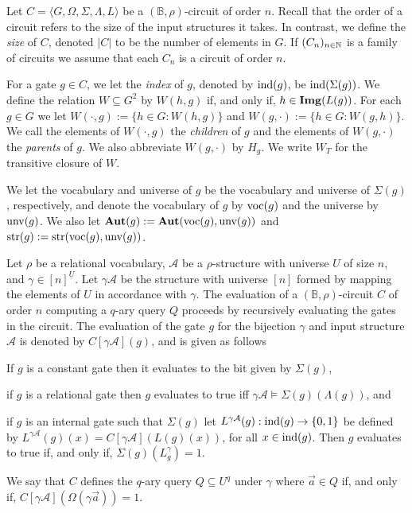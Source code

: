 \documentclass[../main/thesis.tex]{subfiles}
\begin{document}
Let $C = \langle G, \Omega, \Sigma, \Lambda, L \rangle$ be a $(\mathbb{B},
\rho)$-circuit of order $n$. Recall that the order of a circuit refers to the
size of the input structures it takes. In contrast, we define the \emph{size} of
$C$, denoted $\vert C \vert$ to be the number of elements in $G$. If $(C_n)_{n
  \in \mathbb{N}}$ is a family of circuits we assume that each $C_n$ is a circuit of
order $n$.

For a gate $g \in C$, we let the \emph{index} of $g$, denoted by $\text{\upshape ind}(g)$, be
$\text{\upshape ind}(\Sigma(g))$. We define the relation $W \subseteq G^2$ by $W(h,g)$ if, and
only if, $h \in \text{\textbf{Img}}(L(g))$. For each $g \in G$ we let $W(\cdot, g) := \{h \in G
: W(h,g)\}$ and $W(g, \cdot) := \{h \in G : W(g,h)\}$. We call the elements of
$W(\cdot, g)$ the \emph{children} of $g$ and the elements of $W(g, \cdot)$ the
\emph{parents} of $g$. We also abbreviate $W(g, \cdot)$ by $H_g$. We write $W_T$
for the transitive closure of $W$.

We let the vocabulary and universe of $g$ be the vocabulary and universe of
$\Sigma(g)$, respectively, and denote the vocabulary of $g$ by $\text{voc}(g)$ and
the universe by $\text{unv}(g)$. We also let $\text{\textbf{Aut}}(g) := \text{\textbf{Aut}}(\text{voc}(g),
\text{unv}(g))$ and $\text{str}(g) := \text{str}(\text{voc}(g), \text{unv}(g))$.

Let $\rho$ be a relational vocabulary, $\mathcal{A}$ be a $\rho$-structure with
universe $U$ of size $n$, and $\gamma \in [n]^{\underline{U}}$. Let $\gamma
\mathcal{A}$ be the structure with universe $[n]$ formed by mapping the elements
of $U$ in accordance with $\gamma$. The evaluation of a $(\mathbb{B},
\rho)$-circuit $C$ of order $n$ computing a $q$-ary query $Q$ proceeds by
recursively evaluating the gates in the circuit. The evaluation of the gate $g$
for the bijection $\gamma$ and input structure $\mathcal{A}$ is denoted by
$C[\gamma \mathcal{A}](g)$, and is given as follows

\begin{myenum}
\item If $g$ is a constant gate then it evaluates to the bit given by
  $\Sigma(g)$,
\item if $g$ is a relational gate then $g$ evaluates to true iff $\gamma
  \mathcal{A} \models \Sigma(g)(\Lambda (g))$, and
\item if $g$ is an internal gate such that $\Sigma (g)$ let $L^{\gamma
    \mathcal{A}}(g): \text{\upshape ind}(g) \rightarrow \{0,1\}$ be defined by
  $L^{\gamma\mathcal{A}}(g)(x) = C[\gamma \mathcal{A}](L(g)(x))$, for all $x \in
  \text{\upshape ind}(g)$. Then $g$ evaluates to true if, and only if, $\Sigma(g)
  (L^{\gamma}_g) = 1$.
\end{myenum}
We say that $C$ defines the $q$-ary query $Q \subseteq U^q$ under $\gamma$ where
$\vec{a} \in Q$ if, and only if, $C[\gamma \mathcal{A}](\Omega (\gamma \vec{a}))
= 1$.
\end{document}
